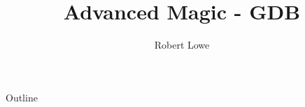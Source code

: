 \documentclass{beamer}
\title{Advanced Magic - GDB}
\author{Robert Lowe\\}
\institute[Maryville College] %
{
  Division of Mathematics and Computer Science\\
  Maryville College
}
\date[]{}
\begin{document}
\begin{frame}
  \titlepage
\end{frame}

\begin{frame}{Outline}
  \tableofcontents
\end{frame}




\end{document}
